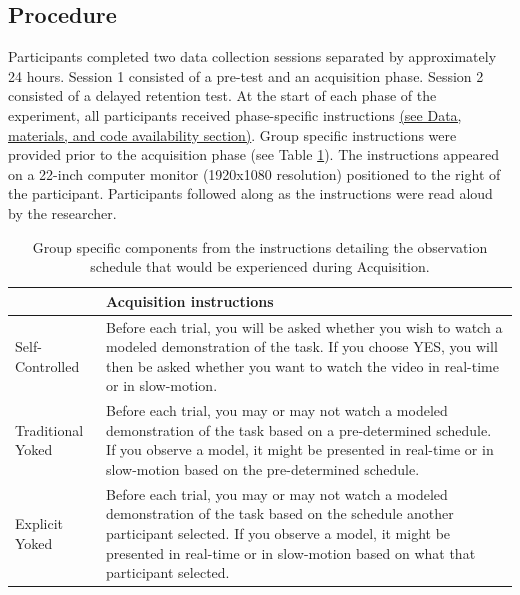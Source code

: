 \documentclass[
  english,
  man, donotrepeattitle,floatsintext]{apa7}
\begin{document}
\hypertarget{procedure}{%
\subsection{Procedure}\label{procedure}}

Participants completed two data collection sessions separated by approximately 24 hours. Session 1 consisted of a pre-test and an acquisition phase. Session 2 consisted of a delayed retention test. At the start of each phase of the experiment, all participants received phase-specific instructions \hyperref[sec:sharing]{(see Data, materials, and code availability section)}. Group specific instructions were provided prior to the acquisition phase (see Table \ref{tab:table1}). The instructions appeared on a 22-inch computer monitor (1920x1080 resolution) positioned to the right of the participant. Participants followed along as the instructions were read aloud by the researcher. \medskip

\begin{table}

\caption{\label{tab:table1}Group specific components from the instructions detailing the observation schedule that would be experienced during Acquisition.}
\fontsize{11}{13}\selectfont
\begin{tabular}[t]{>{\raggedright\arraybackslash}p{8em}>{\raggedright\arraybackslash}p{33em}}
\toprule
  & Acquisition instructions\\
\midrule
Self-Controlled & Before each trial, you will be asked whether you wish to watch a modeled demonstration of the task. If you choose YES, you will then be asked whether you want to watch the video in real-time or in slow-motion.\\
\addlinespace
Traditional Yoked & Before each trial, you may or may not watch a modeled demonstration of the task based on a pre-determined schedule. If you observe a model, it might be presented in real-time or in slow-motion based on the pre-determined schedule.\\
\addlinespace
Explicit Yoked & Before each trial, you may or may not watch a modeled demonstration of the task based on the schedule another participant selected. If you observe a model, it might be presented in real-time or in slow-motion based on what that participant selected.\\
\bottomrule
\end{tabular}
\end{table}
\end{document}
